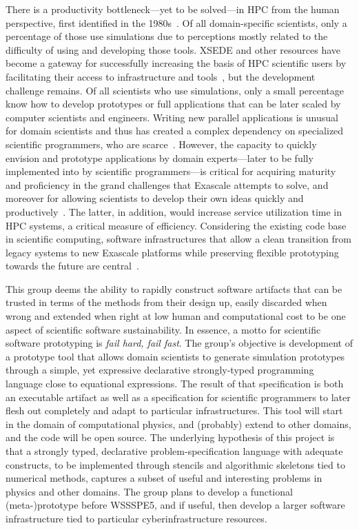 \documentclass[11pt, oneside]{amsart}
\begin{document}
There is a productivity bottleneck---yet to be solved---in HPC from the human
perspective, first identified in the 1980s~\cite{barstow1982automatic}. Of all
domain-specific scientists, only a percentage of those use simulations due to
perceptions mostly related to the difficulty of using and developing those tools.
XSEDE and other resources have become a gateway for successfully increasing the
basis of HPC scientific users by facilitating their access to infrastructure and
tools~\cite{towns2014xsede}, but the development challenge remains.
Of all scientists who use simulations, only a small percentage know how
to develop prototypes or full applications that can be later scaled by computer
scientists and engineers. Writing new parallel applications is unusual for
domain scientists and thus has created a complex dependency on specialized
scientific programmers, who are scarce~\cite{post2005computational}. However,
the capacity to quickly envision and prototype applications by domain
experts---later to be fully implemented into by scientific programmers---is critical for
acquiring maturity and proficiency in the grand challenges that Exascale
attempts to solve, and moreover for allowing scientists to develop their own
ideas quickly and productively~\cite{vinter2015prototyping}. The latter, in
addition, would increase service utilization time in HPC systems, a critical
measure of efficiency. Considering the existing code base in scientific
computing, software infrastructures that allow a clean transition from legacy
systems to new Exascale platforms while preserving flexible prototyping
towards the future are central~\cite{hwu2015transitioning}.

This group deems the ability to rapidly construct software artifacts that can be
trusted in terms of the methods from their design up, easily discarded when
wrong and extended when right at low human and computational cost to be one
aspect of scientific software sustainability. In essence,
a motto for scientific software prototyping is \textit{fail hard, fail fast}.
%
The group's objective is development of a prototype tool that allows domain scientists to generate
simulation prototypes through a simple, yet expressive declarative
strongly-typed programming language close to equational expressions. The result
of that specification is both an executable artifact as well as a specification
for scientific programmers to later flesh out completely and adapt to particular
infrastructures. This tool will start in the domain of computational physics,
and (probably) extend to other domains, and the code will be open source.
%
The underlying hypothesis of this project is that a strongly typed, declarative
problem-specification language with adequate constructs, to be implemented
through stencils and algorithmic skeletons tied to numerical methods, captures a
 subset of useful and interesting problems in physics and other domains.
%
The group plans to develop a functional (meta-)prototype before WSSSPE5, and
if useful, then develop a larger software infrastructure tied to
particular cyberinfrastructure resources.
\end{document}
